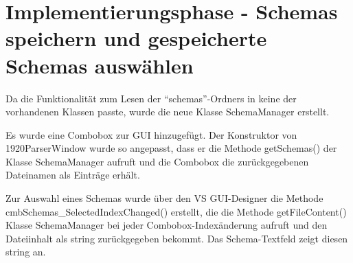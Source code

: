 


\section{Implementierungsphase - Schemas speichern und gespeicherte Schemas auswählen}
\label{sec:Implementierungsphase23e}
Da die Funktionalität zum Lesen der ``schemas''-Ordners in keine der vorhandenen Klassen passte, wurde die neue Klasse SchemaManager erstellt.

Es wurde eine Combobox zur GUI hinzugefügt. Der Konstruktor von 1920ParserWindow wurde so angepasst, dass er die Methode getSchemas() der Klasse SchemaManager aufruft und die Combobox die zurückgegebenen Dateinamen als Einträge erhält.

Zur Auswahl eines Schemas wurde über den \ac{VS} GUI-Designer die Methode cmbSchemas\_SelectedIndexChanged() erstellt, die die Methode getFileContent() Klasse SchemaManager bei jeder Combobox-Indexänderung aufruft und den Dateiinhalt als string zurückgegeben bekommt. Das Schema-Textfeld zeigt diesen string an.




